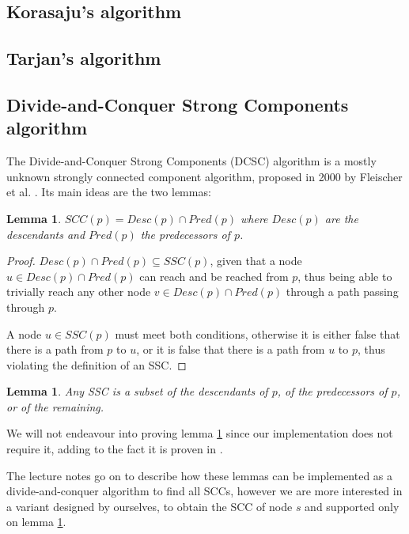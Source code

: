 \documentclass{report}[a4paper]
\newtheorem{lemma}[theorem]{Lemma}
\theoremstyle{remark}
\begin{document}
\subsection{Korasaju's algorithm}
\subsection{Tarjan's algorithm}
\subsection{Divide-and-Conquer Strong Components algorithm}
The Divide-and-Conquer Strong Components (DCSC) algorithm is a mostly unknown strongly connected component algorithm, proposed in 2000 by Fleischer et al. \cite{fleischer-dcsc}. Its main ideas are the two lemmas:
\begin{lemma} \label{lem:dcsc1}
    $SCC(p)=Desc(p) \cap Pred(p)$ where $Desc(p)$ are the descendants and $Pred(p)$ the predecessors of $p$.
\end{lemma}
\begin{proof}
    $Desc(p) \cap Pred(p) \subseteq SSC(p)$, given that a node $u \in Desc(p) \cap Pred(p)$ can reach and be reached from $p$, thus being able to trivially reach any other node $v \in Desc(p) \cap Pred(p)$ through a path passing through $p$.\par
    A node $u \in SSC(p)$ must meet both conditions, otherwise it is either false that there is a path from $p$ to $u$, or it is false that there is a path from $u$ to $p$, thus violating the definition of an SSC.
\end{proof}
\begin{lemma} \label{lem:dcsc2}
    Any SSC is a subset of the descendants of $p$, of the predecessors of $p$, or of the remaining.
\end{lemma}
We will not endeavour into proving lemma \ref{lem:dcsc2} since our implementation does not require it, adding to the fact it is proven in \cite{fleischer-dcsc}.\par
The lecture notes go on to describe how these lemmas can be implemented as a divide-and-conquer algorithm to find all SCCs, however we are more interested in a variant designed by ourselves, to obtain the SCC of node $s$ and supported only on lemma \ref{lem:dcsc1}.
\end{document}

